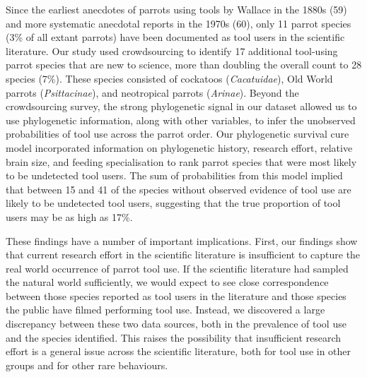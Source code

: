 \documentclass[
  man, donotrepeattitle,floatsintext]{apa6}
\begin{document}
Since the earliest anecdotes of parrots using tools by Wallace in the 1880s
(59) and more systematic anecdotal reports in the 1970s (60),
only 11 parrot species (3\% of all extant parrots) have been documented as tool
users in the scientific literature. Our study used crowdsourcing to identify 17
additional tool-using parrot species that are new to science, more than doubling
the overall count to 28 species (7\%). These species consisted of cockatoos
(\emph{Cacatuidae}), Old World parrots (\emph{Psittacinae}), and neotropical parrots
(\emph{Arinae}). Beyond the crowdsourcing survey, the strong phylogenetic signal in
our dataset allowed us to use phylogenetic information, along with other
variables, to infer the unobserved probabilities of tool use across the parrot
order. Our phylogenetic survival cure model incorporated information on
phylogenetic history, research effort, relative brain size, and feeding
specialisation to rank parrot species that were most likely to be undetected
tool users. The sum of probabilities from this model implied that between 15
and 41 of the species without observed evidence of tool use are likely to be
undetected tool users, suggesting that the true proportion of tool users may be
as high as 17\%.

These findings have a number of important implications. First, our findings show
that current research effort in the scientific literature is insufficient to
capture the real world occurrence of parrot tool use. If the scientific
literature had sampled the natural world sufficiently, we would expect to see
close correspondence between those species reported as tool users in the
literature and those species the public have filmed performing tool use.
Instead, we discovered a large discrepancy between these two data sources, both
in the prevalence of tool use and the species identified. This raises the
possibility that insufficient research effort is a general issue across the
scientific literature, both for tool use in other groups and for other rare
behaviours.
\end{document}
